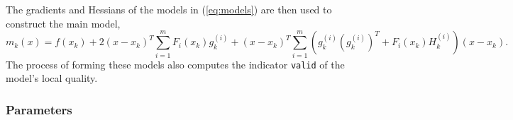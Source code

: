\documentclass[]{book}
\begin{document}
The gradients and Hessians of the models in (\ref{eq:models}) are then
used to construct the main model, 
\begin{equation}
m_k(x) = f(x_k) + 
2(x-x_k)^T \sum_{i=1}^{m} F_i(x_k) g_k^{(i)} +
(x-x_k)^T \sum_{i=1}^{m}
\left( g_k^{(i)} \left(g_k^{(i)}\right)^T +  F_i(x_k)
H_k^{(i)}\right) (x-x_k).
 \label{eq:newton2}
\end{equation}
The process of forming these models also computes the indicator
\texttt{valid} of the model's local quality.


\subsubsection{Parameters}

\end{document}
